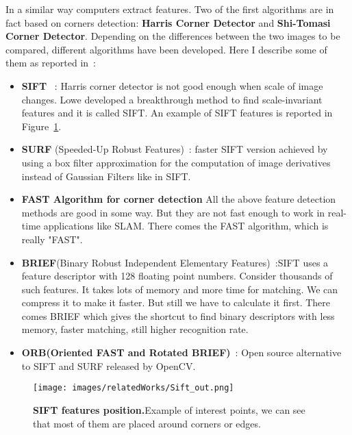 In a similar way computers extract features. Two of the first algorithms are in fact based on corners detection: 
\textbf{Harris Corner Detector} and \textbf{Shi-Tomasi Corner Detector}.
Depending on the differences between the two images to be compared, different algorithms have been developed. Here I describe 
some of them as reported in~\cite{open_cv}:
\begin{itemize}
    \item \textbf{SIFT} ~\cite{Lowe04_SIFT}: Harris corner detector is not good enough when scale of image changes. Lowe developed a breakthrough 
    method to find scale-invariant features and it is called SIFT. An example of SIFT features is reported in Figure~\ref{fig:sift}.
    \item \textbf{SURF} (Speeded-Up Robust Features)~\cite{BAY_SURF}: faster SIFT version achieved by using a box filter approximation for the computation of image derivatives
    instead of Gaussian Filters like in SIFT.
    \item \textbf{FAST Algorithm for corner detection} All the above feature detection methods are good in some way. But they 
    are not fast enough to work in real-time applications like SLAM. There comes the FAST algorithm, which is really "FAST".
    \item \textbf{BRIEF}(Binary Robust Independent Elementary Features)~\cite{Brief}:SIFT uses a feature descriptor with 128 floating point numbers.
     Consider thousands of such features. It takes lots of memory and more time for matching. We can compress it to make it
    faster. But still we have to calculate it first. There comes BRIEF which gives the shortcut to find binary descriptors with less memory, faster matching, still higher recognition rate.
    \item \textbf{ORB(Oriented FAST and Rotated BRIEF)}~\cite{ORB}: Open source alternative to SIFT and SURF released by OpenCV.
\end{itemize}
\begin{figure}[t]
    \centerline{
    \texttt{[image: images/relatedWorks/Sift\_out.png]}} %
    \caption{\textbf{SIFT features position.}Example of interest points, we can see that most of them are placed around corners or edges.}
    \label{fig:sift}
\end{figure}

